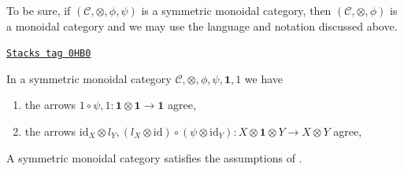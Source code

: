 To be sure, if $(\mathcal{C}, \otimes, \phi, \psi)$ is a
symmetric monoidal category, then $(\mathcal{C}, \otimes, \phi)$
is a monoidal category and we may use the language and notation
discussed above.

\begin{lemma}
\label{categories-lemma-symmetric-monoidal-coherence}
\href{https://stacks.math.columbia.edu/tag/0HB0}{\texttt{Stacks tag 0HB0}}

In a symmetric monoidal category
$\mathcal{C}, \otimes, \phi, \psi, \mathbf{1}, 1$
we have
\begin{enumerate}
\item the arrows $1 \circ \psi, 1 :
\mathbf{1} \otimes \mathbf{1} \to \mathbf{1}$ agree,
\item the arrows $\text{id}_X \otimes l_Y,
(l_X \otimes \text{id}) \circ (\psi \otimes \text{id}_Y):
X \otimes \mathbf{1} \otimes Y \to X \otimes Y$ agree,
\end{enumerate}
A symmetric monoidal category satisfies the assumptions of
\cite[Theorem 5.1]{associativity}.
\end{lemma}

